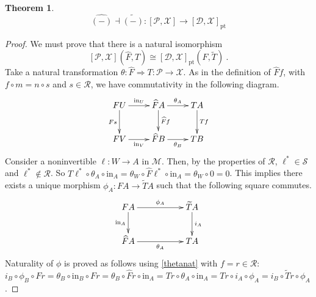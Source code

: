\documentclass[a4paper,12pt,reqno]{amsart}
\newtheorem{theorem}{Theorem}[section] %
\theoremstyle{definition}
\theoremstyle{fact}
\theoremstyle{genquest}
\theoremstyle{step}
\newcommand{\lra}{\longrightarrow}
\newcommand{\ra}{\rightarrow}
\def\CD{{\mathscr D}}
\def\CM{{\mathscr M}}
\def\CP{{\mathscr P}}
\def\CR{{\mathscr R}}
\def\CS{{\mathscr S}}
\def\CX{{\mathscr X}}
\begin{document}
\begin{theorem}\label{adjthm}
\begin{equation*}
\widehat{(-)} \dashv \widetilde{(-)} : [\CP,\CX] \lra [\CD,\CX]_{\mathrm{pt}}
\end{equation*}
\end{theorem}
\begin{proof}
We must prove that there is a natural isomorphism
$$[\CP,\CX](\widehat{F}, T) \cong [\CD,\CX]_{\mathrm{pt}}(F,\widetilde{T}) \ .$$
Take a natural transformation $\theta : \widehat{F}\Rightarrow T :\CP \ra \CX$. 
As in the definition of $\widehat{F}f$, with $f\circ m = n \circ s$ and $s\in \CR$,
we have commutativity in the following diagram. 
\begin{equation}\label{thetanat}
\begin{aligned}
\xymatrix{
FU \ar[r]^-{\mathrm{in}_U} \ar[d]_-{Fs} & \widehat{F}A \ar[d]^-{\widehat{F}f} \ar[r]^-{\theta_A} & TA \ar[d]^-{Tf}\\
FV \ar[r]_-{\mathrm{in}_V} & \widehat{F}B \ar[r]_-{\theta_B} & TB}
\end{aligned}
\end{equation}
Consider a noninvertible $\ell : W \ra A$ in $\CM$. 
Then, by the properties of $\CR$, $\ell^* \in \CS$ and $\ell^* \notin \CR$.
So $T\ell^*\circ \theta_A \circ \mathrm{in}_{A} = \theta_W \circ \widehat{F}\ell^*\circ \mathrm{in}_{A} = \theta_W \circ 0 = 0$. This implies there exists a unique morphism $\phi_A : FA \lra \widetilde{T}A$ 
such that the following square commutes.
\begin{equation}\label{defphi}
\begin{aligned}
\xymatrix{
FA \ar[rr]^-{\phi_A} \ar[d]_-{\mathrm{in}_A} && \widetilde{T}A \ar[d]^-{i_A} \\
\widehat{F}A \ar[rr]_-{\theta_A} && TA}
\end{aligned}
\end{equation}
Naturality of $\phi$ is proved as follows using \eqref{thetanat} with $f=r \in \CR$:
$i_B\circ \phi_B\circ Fr = \theta_B \circ \mathrm{in}_{B} \circ Fr = \theta_B \circ \widehat{F}r \circ \mathrm{in}_{A} = Tr \circ \theta_A \circ \mathrm{in}_{A} = Tr \circ i_A \circ \phi_A = i_B\circ \widetilde{T}r\circ \phi_A $. 


\end{proof}
\end{document}
